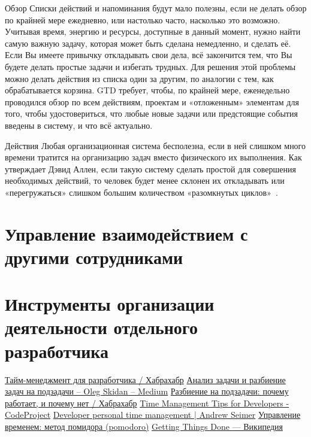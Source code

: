 \documentclass{../industrial-development}
\begin{document}
Обзор
Списки действий и напоминания будут мало полезны, если не делать обзор по крайней мере ежедневно, или настолько часто, насколько это возможно. Учитывая время, энергию и ресурсы, доступные в данный момент, нужно найти самую важную задачу, которая может быть сделана немедленно, и сделать её. Если Вы имеете привычку откладывать свои дела, всё закончится тем, что Вы будете делать простые задачи и избегать трудных. Для решения этой проблемы можно делать действия из списка один за другим, по аналогии с тем, как обрабатывается корзина. GTD требует, чтобы, по крайней мере, еженедельно проводился обзор по всем действиям, проектам и «отложенным» элементам для того, чтобы удостовериться, что любые новые задачи или предстоящие события введены в систему, и что всё актуально.

Действия
Любая организационная система бесполезна, если в ней слишком много времени тратится на организацию задач вместо физического их выполнения. Как утверждает Дэвид Аллен, если такую систему сделать простой для совершения необходимых действий, то человек будет менее склонен их откладывать или «перегружаться» слишком большим количеством «разомкнутых циклов»~\cite{GTDWikipedia}.

\section{Управление взаимодействием с другими сотрудниками}
\section{Инструменты организации деятельности отдельного разработчика}

\begin{thebibliography}{99}
 \href{https://habrahabr.ru/post/259293/}{Тайм-менеджмент для разработчика / Хабрахабр}
 \href{https://medium.com/@skidanolegs/анализ-задачи-и-разбиение-задач-на-подзадачи-21b7865f387f}{Анализ задачи и разбиение задач на подзадачи – Oleg Skidan – Medium}
 \href{https://habrahabr.ru/post/111873/}{Разбиение на подзадачи: почему работает, и почему нет / Хабрахабр}
 \href{https://www.codeproject.com/Articles/11502/Time-Management-Tips-for-Developers}{Time Management Tips for Developers - CodeProject}
 \href{https://lostechies.com/andrewsiemer/2016/01/04/developer-personal-time-management/]}{Developer personal time management | Andrew Seimer}
 \href{https://happydiva.ru/time-management/273-upravlenie-vremenem-metod-pomidora-pomodoro}{Управление временем: метод помидора (pomodoro)}
 \href{https://ru.wikipedia.org/wiki/Getting_Things_Done}{Getting Things Done — Википедия}
\end{thebibliography}
\end{document}
